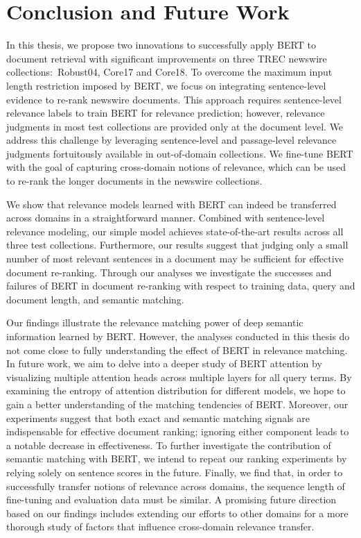 \chapter{Conclusion and Future Work}
\label{ch:conclusion}

In this thesis, we propose two innovations to successfully apply BERT to document retrieval with significant improvements on three TREC newswire collections:\ Robust04, Core17 and Core18.
To overcome the maximum input length restriction imposed by BERT, we focus on integrating sentence-level evidence to re-rank newswire documents.
This approach requires sentence-level relevance labels to train BERT for relevance prediction; however, relevance judgments in most test collections are provided only at the document level.
We address this challenge by leveraging sentence-level and passage-level relevance judgments fortuitously available in out-of-domain collections.
We fine-tune BERT with the goal of capturing cross-domain notions of relevance, which can be used to re-rank the longer documents in the newswire collections.

We show that relevance models learned with BERT can indeed be transferred across domains in a straightforward manner.
Combined with sentence-level relevance modeling, our simple model achieves state-of-the-art results across all three test collections.
Furthermore, our results suggest that judging only a small number of most relevant sentences in a document may be sufficient for effective document re-ranking.
Through our analyses we investigate the successes and failures of BERT in document re-ranking with respect to training data, query and document length, and semantic matching.

Our findings illustrate the relevance matching power of deep semantic information learned by BERT.
However, the analyses conducted in this thesis do not come close to fully understanding the effect of BERT in relevance matching.
In future work, we aim to delve into a deeper study of BERT attention by visualizing multiple attention heads across multiple layers for all query terms.
By examining the entropy of attention distribution for different models, we hope to gain a better understanding of the matching tendencies of BERT.
Moreover, our experiments suggest that both exact and semantic matching signals are indispensable for effective document ranking; ignoring either component leads to a notable decrease in effectiveness.
To further investigate the contribution of semantic matching with BERT, we intend to repeat our ranking experiments by relying solely on sentence scores in the future.
Finally, we find that, in order to successfully transfer notions of relevance across domains, the sequence length of fine-tuning and evaluation data must be similar.
A promising future direction based on our findings includes extending our efforts to other domains for a more thorough study of factors that influence cross-domain relevance transfer.